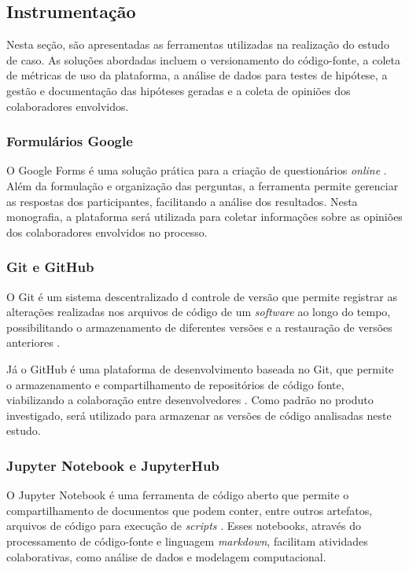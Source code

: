 \subsection{Instrumentação}
\label{subsec:instrument}

Nesta seção, são apresentadas as ferramentas utilizadas na realização do estudo de caso. As soluções abordadas incluem o versionamento do código-fonte, a coleta de métricas de uso da plataforma, a análise de dados para testes de hipótese, a gestão e documentação das hipóteses geradas e a coleta de opiniões dos colaboradores envolvidos.

\subsubsection{Formulários Google}

O Google Forms é uma solução prática para a criação de questionários \textit{online} \cite{forms}. Além da formulação e organização das perguntas, a ferramenta permite gerenciar as respostas dos participantes, facilitando a análise dos resultados. Nesta monografia, a plataforma será utilizada para coletar informações sobre as opiniões dos colaboradores envolvidos no processo.

\subsubsection{Git e GitHub}

O Git é um sistema descentralizado d controle de versão que permite registrar as alterações realizadas nos arquivos de código de um \textit{software} ao longo do tempo, possibilitando o armazenamento de diferentes versões e a restauração de versões anteriores \cite{git}.

Já o GitHub é uma plataforma de desenvolvimento baseada no Git, que permite o armazenamento e compartilhamento de repositórios de código fonte, viabilizando a colaboração entre desenvolvedores \cite{github}. Como padrão no produto investigado, será utilizado para armazenar as versões de código analisadas neste estudo.

\subsubsection{Jupyter Notebook e JupyterHub}

O Jupyter Notebook é uma ferramenta de código aberto que permite o compartilhamento de documentos que podem conter, entre outros artefatos, arquivos de código para execução de \textit{scripts} \cite{jupyter_notebook}. Esses notebooks, através do processamento de código-fonte e linguagem \textit{markdown}, facilitam atividades colaborativas, como análise de dados e modelagem computacional.

